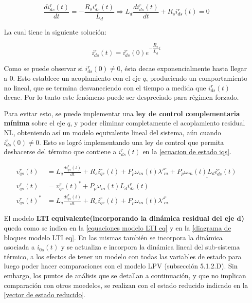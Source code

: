 \documentclass[a4paper, 10pt, onecolumn,journal]{ieeeconf}
\begin{document}
\begin{equation}
	\frac{d i^r_{ds}(t)}{dt} = -\frac{R_s i^r_{ds}(t)}{L_d} \Rightarrow L_d\frac{d i^r_{ds}(t)}{dt} + R_s i^r_{ds}(t) = 0
	\label{ecuacion dinamica residual ids}
\end{equation}

La cual tiene la siguiente solución:

\begin{equation}
	{i}^r_{ds}(t) = {i}^r_{ds}(0) e^{-\dfrac{R_s}{L_d}t} 
\end{equation}

Como se puede observar  si $i^{r}_{ds}(0)\neq0$, ésta decae exponencialmente hasta llegar a 0. Esto establece un acoplamiento con el eje $q$, produciendo un comportamiento no lineal, que se termina desvaneciendo con el tiempo a medida que $i^{r}_{ds}(t)$ decae. Por lo tanto este fenómeno puede ser despreciado para régimen forzado.

Para evitar esto, se puede implementar una \textbf{ley de control complementaria mínima} sobre el eje $q$, y poder eliminar completamente el acoplamiento residual NL, obteniendo así un modelo equivalente lineal del sistema, aún cuando $i^{r}_{ds}(0)\neq0$. Esto se logró implementando una ley de control que permita deshacerse del término que contiene a $i^{r}_{ds}(t)$ en la \cref{ecuacion de estado iqs}.

\begin{align}
	v^r_{qs}(t) &= L_q\frac{d i^r_{qs}(t)}{dt} + R_s i^r_{qs}(t) +P_p \omega_m(t) \lambda'^r_m +\underline{P_p \omega_m(t) L_d i^r_{ds}(t)} \label{ley de control complementaria 1 }\\
	v^r_{qs}(t) &= v^r_{qs}(t)^{*} + P_p \omega_m(t) L_d i^r_{ds}(t)  \label{ley de control complementaria 2}\\
 	v^r_{qs}(t)^{*} &= L_q\frac{d i^r_{qs}(t)}{dt} + R_s i^r_{qs}(t) +P_p \omega_m(t) \lambda'^r_m  \label{ley de control complementaria 3}
\end{align}

El modelo \textbf{LTI equivalente(incorporando la dinámica residual del eje $\mathbf{d}$)} queda como se indica en la \cref{equaciones modelo LTI eq} y en la \cref{diagrama de bloques modelo LTI eq}. En
las mismas también se incorpora la dinámica asociada a $i_{0s}(t)$ y se actualiza e incorpora la dinámica lineal del sub-sistema térmico, a los efectos de tener un modelo con todas las variables de estado 
para luego poder hacer comparaciones con el modelo LPV (subsección 5.1.2.D). Sin embargo, los puntos de análisis que se detallan a continuación, y que no implican
comparación con otros moedelos, se realizan con el estado reducido indicado en la \cref{vector de estado reducido}.
\end{document}
